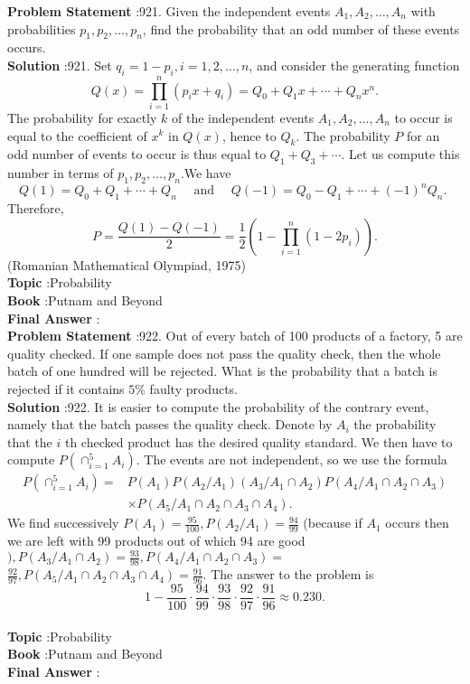 \documentclass[10pt]{article}
\begin{document}
\textbf{Problem Statement} :921. Given the independent events $A_{1}, A_{2}, \ldots, A_{n}$ with probabilities $p_{1}, p_{2}, \ldots, p_{n}$, find the probability that an odd number of these events occurs.\\
\textbf{Solution} :921. Set $q_{i}=1-p_{i}, i=1,2, \ldots, n$, and consider the generating function$$ Q(x)=\prod_{i=1}^{n}\left(p_{i} x+q_{i}\right)=Q_{0}+Q_{1} x+\cdots+Q_{n} x^{n} . $$The probability for exactly $k$ of the independent events $A_{1}, A_{2}, \ldots, A_{n}$ to occur is equal to the coefficient of $x^{k}$ in $Q(x)$, hence to $Q_{k}$. The probability $P$ for an odd number of events to occur is thus equal to $Q_{1}+Q_{3}+\cdots$. Let us compute this number in terms of $p_{1}, p_{2}, \ldots, p_{n}$.We have$$ Q(1)=Q_{0}+Q_{1}+\cdots+Q_{n} \quad \text { and } \quad Q(-1)=Q_{0}-Q_{1}+\cdots+(-1)^{n} Q_{n} \text {. } $$Therefore,$$ P=\frac{Q(1)-Q(-1)}{2}=\frac{1}{2}\left(1-\prod_{i=1}^{n}\left(1-2 p_{i}\right)\right) . $$(Romanian Mathematical Olympiad, 1975)\\
\textbf{Topic} :Probability\\
\textbf{Book} :Putnam and Beyond\\
\textbf{Final Answer} :\\


\textbf{Problem Statement} :922. Out of every batch of 100 products of a factory, 5 are quality checked. If one sample does not pass the quality check, then the whole batch of one hundred will be rejected. What is the probability that a batch is rejected if it contains $5 \%$ faulty products.\\
\textbf{Solution} :922. It is easier to compute the probability of the contrary event, namely that the batch passes the quality check. Denote by $A_{i}$ the probability that the $i$ th checked product has the desired quality standard. We then have to compute $P\left(\cap_{i=1}^{5} A_{i}\right)$. The events are not independent, so we use the formula$$ \begin{aligned} P\left(\cap_{i=1}^{5} A_{i}\right)=& P\left(A_{1}\right) P\left(A_{2} / A_{1}\right)\left(A_{3} / A_{1} \cap A_{2}\right) P\left(A_{4} / A_{1} \cap A_{2} \cap A_{3}\right) \\ & \times P\left(A_{5} / A_{1} \cap A_{2} \cap A_{3} \cap A_{4}\right) . \end{aligned} $$We find successively $P\left(A_{1}\right)=\frac{95}{100}, P\left(A_{2} / A_{1}\right)=\frac{94}{99}$ (because if $A_{1}$ occurs then we are left with 99 products out of which 94 are good $), P\left(A_{3} / A_{1} \cap A_{2}\right)=\frac{93}{98}, P\left(A_{4} / A_{1} \cap A_{2} \cap A_{3}\right)=$ $\frac{92}{97}, P\left(A_{5} / A_{1} \cap A_{2} \cap A_{3} \cap A_{4}\right)=\frac{91}{96}$. The answer to the problem is $$ 1-\frac{95}{100} \cdot \frac{94}{99} \cdot \frac{93}{98} \cdot \frac{92}{97} \cdot \frac{91}{96} \approx 0.230 . $$\\
\textbf{Topic} :Probability\\
\textbf{Book} :Putnam and Beyond\\
\textbf{Final Answer} :\\
\end{document}
